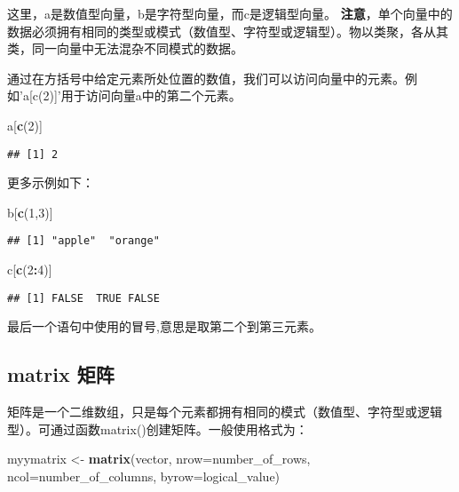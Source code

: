 \documentclass[]{book}
\newenvironment{Shaded}{\begin{snugshade}}{\end{snugshade}}
\newcommand{\DataTypeTok}[1]{\textcolor[rgb]{0.13,0.29,0.53}{#1}}
\newcommand{\DecValTok}[1]{\textcolor[rgb]{0.00,0.00,0.81}{#1}}
\newcommand{\KeywordTok}[1]{\textcolor[rgb]{0.13,0.29,0.53}{\textbf{#1}}}
\newcommand{\NormalTok}[1]{#1}
\newcommand{\OperatorTok}[1]{\textcolor[rgb]{0.81,0.36,0.00}{\textbf{#1}}}
\newcommand{\StringTok}[1]{\textcolor[rgb]{0.31,0.60,0.02}{#1}}
\begin{document}
这里，a是数值型向量，b是字符型向量，而c是逻辑型向量。
\textbf{注意}，单个向量中的数据必须拥有相同的类型或模式（数值型、字符型或逻辑型）。物以类聚，各从其类，同一向量中无法混杂不同模式的数据。

通过在方括号中给定元素所处位置的数值，我们可以访问向量中的元素。例如'a{[}c(2){]}'用于访问向量a中的第二个元素。

\begin{Shaded}
\begin{Highlighting}[]
\NormalTok{a[}\KeywordTok{c}\NormalTok{(}\DecValTok{2}\NormalTok{)]}
\end{Highlighting}
\end{Shaded}

\begin{verbatim}
## [1] 2
\end{verbatim}

更多示例如下：

\begin{Shaded}
\begin{Highlighting}[]
\NormalTok{b[}\KeywordTok{c}\NormalTok{(}\DecValTok{1}\NormalTok{,}\DecValTok{3}\NormalTok{)]}
\end{Highlighting}
\end{Shaded}

\begin{verbatim}
## [1] "apple"  "orange"
\end{verbatim}

\begin{Shaded}
\begin{Highlighting}[]
\NormalTok{c[}\KeywordTok{c}\NormalTok{(}\DecValTok{2}\OperatorTok{:}\DecValTok{4}\NormalTok{)]}
\end{Highlighting}
\end{Shaded}

\begin{verbatim}
## [1] FALSE  TRUE FALSE
\end{verbatim}

最后一个语句中使用的冒号,意思是取第二个到第三元素。

\hypertarget{matrix-}{%
\subsection{matrix 矩阵}\label{matrix-}}

矩阵是一个二维数组，只是每个元素都拥有相同的模式（数值型、字符型或逻辑型）。可通过函数matrix()创建矩阵。一般使用格式为：

\begin{Shaded}
\begin{Highlighting}[]
\NormalTok{myymatrix <-}\StringTok{ }\KeywordTok{matrix}\NormalTok{(vector, }\DataTypeTok{nrow=}\NormalTok{number_of_rows, }\DataTypeTok{ncol=}\NormalTok{number_of_columns,}
                    \DataTypeTok{byrow=}\NormalTok{logical_value)}
\end{Highlighting}
\end{Shaded}
\end{document}
